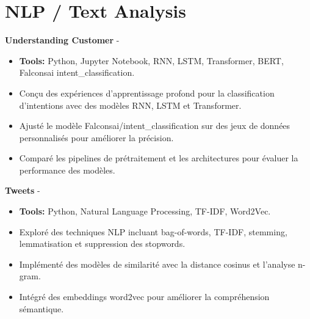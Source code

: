 \documentclass[a4paper,11pt]{article}%
\begin{document}
\section*{NLP / Text Analysis}%
%
\noindent \textbf{Understanding Customer} - \href{https://github.com/sboof911/Understanding-customer}{{}}%
\begin{itemize}[leftmargin=2em,parsep=0pt,topsep=1em]%
\item[] \textbf{Tools:} Python, Jupyter Notebook, RNN, LSTM, Transformer, BERT, Falconsai intent\_classification.%
\item Con\c{c}u des exp\'eriences d'apprentissage profond pour la classification d'intentions avec des mod\`eles RNN, LSTM et Transformer.%
\item Ajust\'e le mod\`ele Falconsai/intent\_classification sur des jeux de donn\'ees personnalis\'es pour am\'eliorer la pr\'ecision.%
\item Compar\'e les pipelines de pr\'etraitement et les architectures pour \'evaluer la performance des mod\`eles.%
\end{itemize}%
%
\noindent \textbf{Tweets} - \href{https://github.com/sboof911/tweets}{{}}%
\begin{itemize}[leftmargin=2em,parsep=0pt,topsep=1em]%
\item[] \textbf{Tools:} Python, Natural Language Processing, TF-IDF, Word2Vec.%
\item Explor\'e des techniques NLP incluant bag-of-words, TF-IDF, stemming, lemmatisation et suppression des stopwords.%
\item Impl\'ement\'e des mod\`eles de similarit\'e avec la distance cosinus et l'analyse n-gram.%
\item Int\'egr\'e des embeddings word2vec pour am\'eliorer la compr\'ehension s\'emantique.%
\end{itemize}%
%
\end{document}
